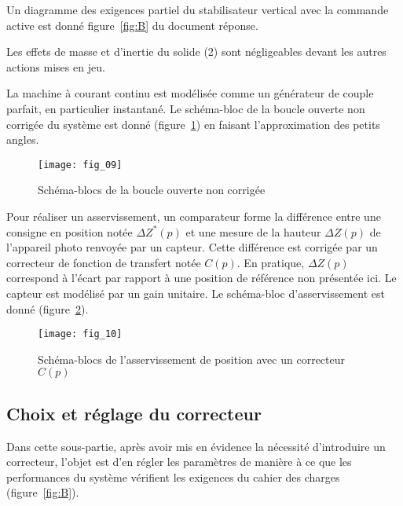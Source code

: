 Un diagramme des exigences partiel du stabilisateur vertical avec la commande active est donné figure~\ref{fig:B} du document réponse.

Les effets de masse et d'inertie du solide (2) sont négligeables devant les autres actions mises en jeu.

\ifprof
\begin{corrige}
\end{corrige}
\else
\fi





La machine à courant continu est modélisée comme un générateur de couple parfait, en particulier instantané. Le schéma-bloc de la boucle ouverte non corrigée du système est donné (figure~\ref{fig:09}) en faisant l'approximation des petits angles.

\begin{figure}[H]
\centering
\texttt{[image: fig\_09]}
\caption{\label{fig:09} Schéma-blocs de la boucle ouverte non corrigée}
\end{figure}


Pour réaliser un asservissement, un comparateur forme la différence entre une consigne en position notée $\Delta Z^{*}(p)$ et une mesure de la hauteur $\Delta Z(p)$ de l'appareil photo renvoyée par un capteur. Cette différence est corrigée par un correcteur de fonction de transfert notée $C(p)$. En pratique, $\Delta Z(p)$ correspond à l'écart par rapport à une position de référence non présentée ici. Le capteur est modélisé par un gain unitaire. Le schéma-bloc d'asservissement est donné (figure~\ref{fig:10}).

\begin{figure}[H]
\centering
\texttt{[image: fig\_10]}
\caption{\label{fig:10} Schéma-blocs de l'asservissement de position avec un correcteur $C(p)$}
\end{figure}



\subsection{Choix et réglage du correcteur}
Dans cette sous-partie, après avoir mis en évidence la nécessité d'introduire un correcteur, l'objet est d'en régler les paramètres de manière à ce que les performances du système vérifient les exigences du cahier des charges (figure~\ref{fig:B}).

